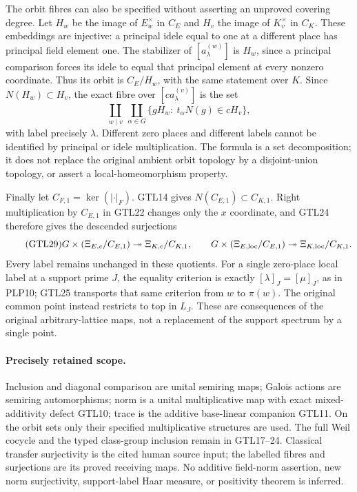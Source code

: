The orbit fibres can also be specified without asserting an
unproved covering degree. Let $H_w$ be the image of
$E_w^\times$ in $C_E$ and $H_v$ the image of $K_v^\times$ in
$C_K$. These embeddings are injective: a principal idele equal
to one at a different place has principal field element one.
The stabilizer of $[a^{(w)}_\lambda]$ is $H_w$, since a
principal comparison forces its idele to equal that principal
element at every nonzero coordinate. Thus its orbit is $C_E/H_w$,
with the same statement over $K$. Since $N(H_w)\subset H_v$,
the exact fibre over $[c a^{(v)}_\lambda]$ is the set
\begin{equation}\tag{GTL28}
 \coprod_{w\mid v}\ \coprod_{\alpha\in G}
  \{gH_w:\ t_\alpha N(g)\in cH_v\},
\end{equation}
with label precisely $\lambda$. Different zero places and
different labels cannot be identified by principal or idele
multiplication. The formula is a set decomposition; it does
not replace the original ambient orbit topology by a
disjoint-union topology, or assert a local-homeomorphism property.

Finally let $C_{F,1}=\ker(|\cdot|_F)$. GTL14 gives
$N(C_{E,1})\subset C_{K,1}$. Right multiplication by $C_{E,1}$
in GTL22 changes only the $x$ coordinate, and GTL24 therefore
gives the descended surjections
\begin{equation}\tag{GTL29}
 G\times(\Xi_{E,c}/C_{E,1})\twoheadrightarrow
                      \Xi_{K,c}/C_{K,1},\qquad
 G\times(\Xi_{E,\rm loc}/C_{E,1})\twoheadrightarrow
                      \Xi_{K,\rm loc}/C_{K,1}.
\end{equation}
Every label remains unchanged in these quotients. For a single
zero-place local label at a support prime $J$, the equality
criterion is exactly $[\lambda]_J=[\mu]_J$, as in PLP10;
GTL25 transports that same criterion from $w$ to $\pi(w)$.
The original common point instead restricts to top in $L_J$.
These are consequences of the original arbitrary-lattice maps,
not a replacement of the support spectrum by a single point.

\paragraph{Precisely retained scope.}
Inclusion and diagonal comparison are unital semiring maps;
Galois actions are semiring automorphisms; norm is a unital
multiplicative map with exact mixed-additivity defect GTL10;
trace is the additive base-linear companion GTL11. On the orbit
sets only their specified multiplicative structures are used.
The full Weil cocycle and the typed class-group inclusion remain
in GTL17--24. Classical transfer surjectivity is the cited human
source input; the labelled fibres and surjections are its proved
receiving maps. No additive field-norm assertion, new norm
surjectivity, support-label Haar measure, or positivity theorem
is inferred.
